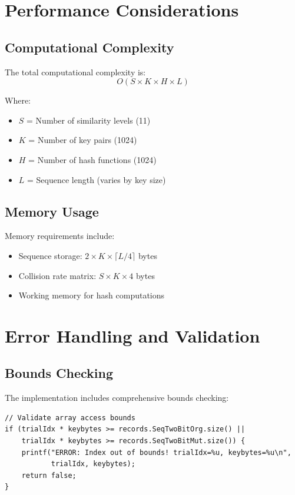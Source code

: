\documentclass[11pt,a4paper]{article}
\begin{document}
\section{Performance Considerations}

\subsection{Computational Complexity}

The total computational complexity is:
\begin{equation}
O(S \times K \times H \times L)
\end{equation}

Where:
\begin{itemize}
    \item $S$ = Number of similarity levels (11)
    \item $K$ = Number of key pairs (1024)
    \item $H$ = Number of hash functions (1024)  
    \item $L$ = Sequence length (varies by key size)
\end{itemize}

\subsection{Memory Usage}

Memory requirements include:
\begin{itemize}
    \item Sequence storage: $2 \times K \times \lceil L/4 \rceil$ bytes
    \item Collision rate matrix: $S \times K \times 4$ bytes
    \item Working memory for hash computations
\end{itemize}

\section{Error Handling and Validation}

\subsection{Bounds Checking}

The implementation includes comprehensive bounds checking:

\begin{lstlisting}[caption=Bounds Validation]
// Validate array access bounds
if (trialIdx * keybytes >= records.SeqTwoBitOrg.size() || 
    trialIdx * keybytes >= records.SeqTwoBitMut.size()) {
    printf("ERROR: Index out of bounds! trialIdx=%u, keybytes=%u\n", 
           trialIdx, keybytes);
    return false;
}
\end{lstlisting}
\end{document}
